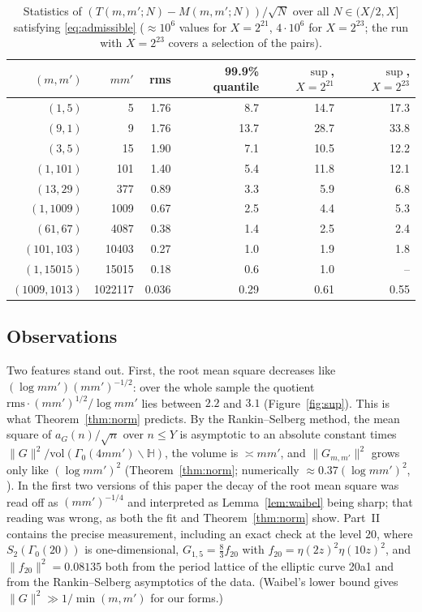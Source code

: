 \documentclass[11pt]{amsart}
\theoremstyle{remark}
\newcommand{\HH}{\mathbb{H}}
\begin{document}
\begin{table}[ht]
\centering
\small
\begin{tabular}{rrrrrr}
\hline
$(m,m')$ & $mm'$ & rms & 99.9\% quantile & $\sup$, $X=2^{21}$ & $\sup$, $X=2^{23}$\\
\hline
$(1,5)$ & 5 & 1.76 & 8.7 & 14.7 & 17.3\\
$(9,1)$ & 9 & 1.76 & 13.7 & 28.7 & 33.8\\
$(3,5)$ & 15 & 1.90 & 7.1 & 10.5 & 12.2\\
$(1,101)$ & 101 & 1.40 & 5.4 & 11.8 & 12.1\\
$(13,29)$ & 377 & 0.89 & 3.3 & 5.9 & 6.8\\
$(1,1009)$ & 1009 & 0.67 & 2.5 & 4.4 & 5.3\\
$(61,67)$ & 4087 & 0.38 & 1.4 & 2.5 & 2.4\\
$(101,103)$ & 10403 & 0.27 & 1.0 & 1.9 & 1.8\\
$(1,15015)$ & 15015 & 0.18 & 0.6 & 1.0 & --\\
$(1009,1013)$ & 1022117 & 0.036 & 0.29 & 0.61 & 0.55\\
\hline
\end{tabular}
\medskip
\caption{Statistics of $(T(m,m';N)-M(m,m';N))/\sqrt N$ over all $N\in(X/2,X]$ satisfying \eqref{eq:admissible} ($\approx10^6$ values for $X=2^{21}$, $4\cdot10^6$ for $X=2^{23}$; the run with $X=2^{23}$ covers a selection of the pairs).}
\label{tab:num}
\end{table}

\subsection{Observations}
Two features stand out. First, the root mean square decreases like $(\log mm')(mm')^{-1/2}$: over the whole sample the quotient $\mathrm{rms}\cdot(mm')^{1/2}/\log mm'$ lies between $2.2$ and $3.1$ (Figure~\ref{fig:sup}). This is what Theorem~\ref{thm:norm} predicts. By the Rankin--Selberg method, the mean square of $a_G(n)/\sqrt n$ over $n\le Y$ is asymptotic to an absolute constant times $\|G\|^2/\mathrm{vol}(\Gamma_0(4mm')\backslash\HH)$, the volume is $\asymp mm'$, and $\|G_{m,m'}\|^2$ grows only like $(\log mm')^2$ (Theorem~\ref{thm:norm}; numerically $\approx0.37(\log mm')^2$, \cite[Section~5]{ChenII}). In the first two versions of this paper the decay of the root mean square was read off as $(mm')^{-1/4}$ and interpreted as Lemma~\ref{lem:waibel} being sharp; that reading was wrong, as both the fit and Theorem~\ref{thm:norm} show. Part~II contains the precise measurement, including an exact check at the level $20$, where $S_2(\Gamma_0(20))$ is one-dimensional, $G_{1,5}=\frac83f_{20}$ with $f_{20}=\eta(2z)^2\eta(10z)^2$, and $\|f_{20}\|^2=0.08135$ both from the period lattice of the elliptic curve 20a1 and from the Rankin--Selberg asymptotics of the data. (Waibel's lower bound \cite[Theorem~3]{Waibel} gives $\|G\|^2\gg1/\min(m,m')$ for our forms.)
\end{document}
